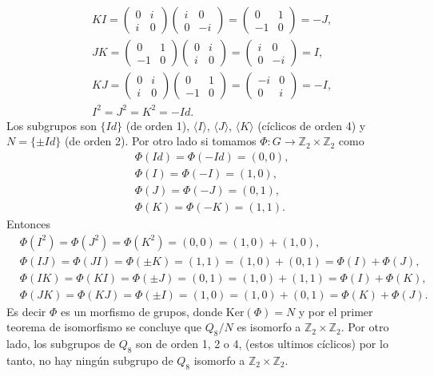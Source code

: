 \documentclass[11pt,letterpaper]{article}
\newcommand{\Z}{\mathbb{Z}}
\begin{document}
\begin{Solucion}
\begin{align*}
        &KI=\begin{pmatrix} 0 & i \\ i & 0\end{pmatrix}\begin{pmatrix} i & 0 \\ 0 & -i\end{pmatrix}=\begin{pmatrix} 0 & 1 \\ -1 & 0\end{pmatrix}=-J, \\
        &JK=\begin{pmatrix} 0 & 1 \\ -1 & 0\end{pmatrix}\begin{pmatrix} 0 & i \\ i & 0\end{pmatrix}=\begin{pmatrix} i & 0 \\ 0 & -i\end{pmatrix}=I, \\
        &KJ=\begin{pmatrix} 0 & i \\ i & 0\end{pmatrix}\begin{pmatrix} 0 & 1 \\ -1 & 0\end{pmatrix}=\begin{pmatrix} -i & 0 \\ 0 & i\end{pmatrix}=-I, \\
        &I^2=J^2=K^2=-Id.
    \end{align*}
    Los subgrupos son \(\{Id\}\) (de orden 1), \(\langle I \rangle\), \(\langle J \rangle\), \(\langle K \rangle\) (cíclicos de orden 4) y \(N=\{\pm Id\}\) (de orden 2). Por otro lado
    si tomamos \(\Phi : G \rightarrow \Z_2 \times \Z_2\) como 
    \begin{align*}
        &\Phi(Id)=\Phi(-Id)=(0,0), \\
        &\Phi(I)=\Phi(-I)=(1,0), \\
        &\Phi(J)=\Phi(-J)=(0,1), \\
        &\Phi(K)=\Phi(-K)=(1,1).
    \end{align*}
    Entonces 
    \begin{align*}
        &\Phi(I^2)=\Phi(J^2)=\Phi(K^2)=(0,0)= (1,0) + (1,0), \\
        &\Phi(IJ)=\Phi(JI)=\Phi(\pm K)=(1,1) = (1,0) + (0,1) = \Phi(I) + \Phi(J), \\
        &\Phi(IK)=\Phi(KI)=\Phi(\pm J)=(0,1) = (1,0) + (1,1) = \Phi(I) + \Phi(K), \\   
        &\Phi(JK)=\Phi(KJ)=\Phi(\pm I)=(1,0) = (1,0) + (0,1) = \Phi(K) + \Phi(J). 
    \end{align*}
    Es decir \(\Phi\) es un morfismo de grupos, donde \(\mathrm{Ker}(\Phi)=N\) y por el primer teorema de isomorfismo se concluye que \(Q_8/N\) es isomorfo a \(\Z_2 \times \Z_2\). 
    Por otro lado, los subgrupos de \(Q_8\) son de orden 1, 2 o 4, (estos ultimos cíclicos) por lo tanto, no hay ningún subgrupo de \(Q_8\) isomorfo a \(\Z_2 \times \Z_2\). 
\end{Solucion}
\end{document}
